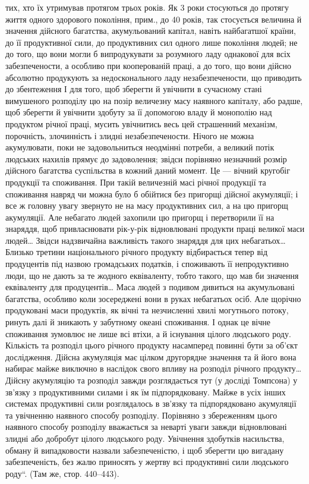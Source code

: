 \parcont{}  %
тих, хто їх утримував протягом трьох років. Як 3 роки стосуються
до протягу життя одного здорового покоління, прим., до 40 років,
так стосується величина й значення дійсного багатства, акумульований
капітал, навіть найбагатшої країни, до її продуктивної сили, до продуктивних
сил одного лише покоління людей; не до того, що вони могли б
випродукувати за розумного ладу однакової для всіх забезпечености, а
особливо при кооперованій праці, а до того, що вони дійсно абсолютно
продукують за недосконального ладу незабезпечености, що приводить до
збентеження І для того, щоб зберегти й увічнити в сучасному стані вимушеного
розподілу цю на позір величезну масу наявного капіталу, або радше,
щоб зберегти й увічнити здобуту за її допомогою владу й монополію
над продуктом річної праці, мусить увічнитись весь цей страшенний
механізм, порочність, злочинність і злидні незабезпечености. Нічого не
можна акумулювати, поки не задовольниться неодмінні потреби, а великий
потік людських нахилів прямує до задоволення; звідси порівняно незначний
розмір дійсного багатства суспільства в кожний даний момент.
Це — вічний кругобіг продукції та споживання. При такій величезній масі
річної продукції та споживання навряд чи можна було б обійтися без
пригорщі дійсної акумуляції; і все ж головну увагу звернуто не на
масу продуктивних сил, а на цю пригорщ акумуляції. Але небагато
людей захопили цю пригорщ і перетворили її на знаряддя, щоб
привласнювати рік-у-рік відновлювані продукти праці великої маси людей\dots{}
Звідси надзвичайна важливість такого знаряддя для цих небагатьох\dots{}
Близько третини національного річного продукту відбирається тепер від
продуцентів під назвою громадських податків, і споживають її непродуктивно
люди, що не дають за те жодного еквіваленту, тобто такого, що
мав би значення еквіваленту для продуцентів\dots{} Маса людей з подивом
дивиться на акумульовані багатства, особливо коли зосереджені вони в
руках небагатьох осіб. Але щорічно продуковані маси продуктів, як
вічні та незчисленні хвилі могутнього потоку, ринуть далі й зникають у
забутному океані споживання. І однак це вічне споживання зумовлює
не лише всі втіхи, а й існування цілого людського роду. Кількість та
розподіл цього річного продукту насамперед повинні бути за об’єкт дослідження.
Дійсна акумуляція має цілком другорядне значення та й його
вона набирає майже виключно в наслідок свого впливу на розподіл річного
продукту\dots{} Дійсну акумуляцію та розподіл завжди розглядається тут
(у досліді Томпсона) у зв'язку з продуктивними силами і як їм підпорядковану.
Майже в усіх інших системах продуктивні сили розглядалось
в зв’язку та підпорядковано акумуляції та увічненню наявного
способу розподілу. Порівняно з збереженням цього наявного способу
розподілу вважається за неварті уваги завжди відновлювані злидні або
добробут цілого людського роду. Увічнення здобутків насильства, обману
й випадковости назвали забезпеченістю, і щоб зберегти цю вигадану
забезпеченість, без жалю приносять у жертву всі продуктивні сили
людського роду“. (Там же, стор. 440--443).
